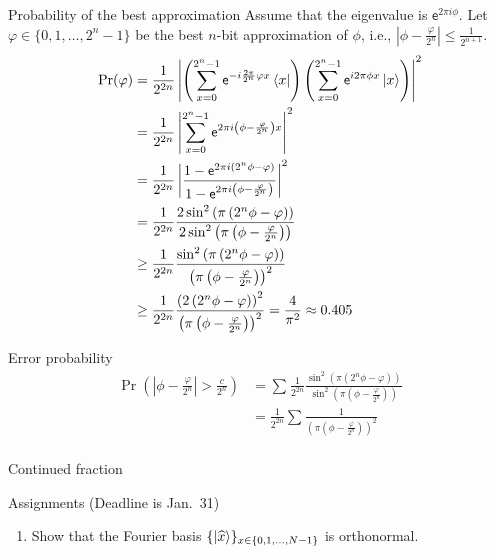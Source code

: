 \documentclass{beamer}
\newcommand\emm[1]{\textcolor{redorange}{{#1}}}
\begin{document}
\begin{frame}{Probability of the best approximation}
\small
Assume that the eigenvalue is $\mathsf{e}^{2\pi i\phi}$.
Let $\varphi\in\{0,1,\dotsc,2^n-1\}$ be the best $n$-bit approximation of $\phi$, i.e., \emm{$|\phi - \frac{\varphi}{2^n}|\le \frac1{2^{n+1}}$}.
\begin{align*}
\Pr(\varphi) &= \frac1{2^{2n}}\left|\left(\sum_{x=0}^{2^n-1} \mathsf{e}^{-i\frac{2\pi}{2^n}\varphi x}\bra{x}\right)\left(\sum_{x=0}^{2^n-1} \mathsf{e}^{i 2\pi\phi x}\ket{x}\right)\right|^2\\
&= \frac1{2^{2n}}\left|\sum_{x=0}^{2^n-1} \mathsf{e}^{2\pi i\left(\phi - \frac{\varphi}{2^n}\right) x}\right|^2\\
&= \frac1{2^{2n}}\left|\frac{1-\mathsf{e}^{2\pi i\left(2^n\phi - \varphi\right)}}{1-\mathsf{e}^{2\pi i\left(\phi - \frac{\varphi}{2^n}\right)}}\right|^2\\
&= \frac1{2^{2n}}\frac{2\sin^2\left(\pi\left(2^n\phi - \varphi\right)\right)}{2\sin^2\left(\pi\left(\phi - \frac{\varphi}{2^n}\right)\right)}\\
&\ge \frac1{2^{2n}}\frac{\sin^2\left(\pi\left(2^n\phi - \varphi\right)\right)}{\left(\pi\left(\phi - \frac{\varphi}{2^n}\right)\right)^2}\\
&\ge \frac1{2^{2n}}\frac{\left(2\left(2^n\phi - \varphi\right)\right)^2}{\left(\pi\left(\phi - \frac{\varphi}{2^n}\right)\right)^2}
= \frac{4}{\pi^2}\approx 0.405
\end{align*}
\end{frame}
\fi

\begin{frame}{Error probability}
\begin{align*}
\Pr\left(\left|\phi - \frac{\varphi}{2^n}\right| > \frac{c}{2^n}\right)
&=\sum_{} \frac1{2^{2n}}\frac{\sin^2\left(\pi\left(2^n\phi - \varphi\right)\right)}{\sin^2\left(\pi\left(\phi - \frac{\varphi}{2^n}\right)\right)}\\
&= \frac1{2^{2n}}\sum_{}\frac{1}{\left(\pi\left(\phi - \frac{\varphi}{2^n}\right)\right)^2}\\
\end{align*}
\end{frame}

\begin{frame}{Continued fraction}
\end{frame}


\begin{frame}{Assignments (Deadline is Jan.\ 31)}
\small
\begin{enumerate}
\setlength{\itemsep}{2em}
\item Show that the Fourier basis $\{\ket{\widehat{x}}\}_{x\in\{0,1,\dotsc,N-1\}}$ is orthonormal.
\end{enumerate}
\end{frame}
\end{document}
